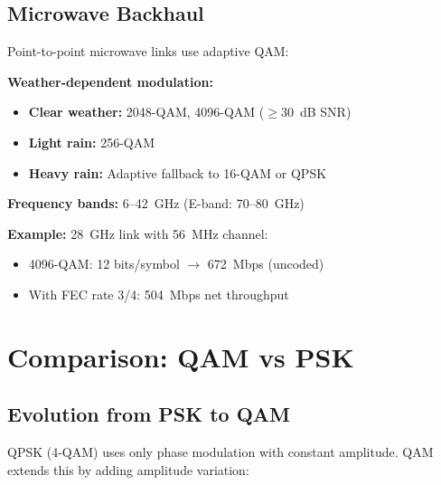\subsection{Microwave Backhaul}

Point-to-point microwave links use adaptive QAM:

\textbf{Weather-dependent modulation:}
\begin{itemize}
\item \textbf{Clear weather:} 2048-QAM, 4096-QAM ($\geq 30$~dB SNR)
\item \textbf{Light rain:} 256-QAM
\item \textbf{Heavy rain:} Adaptive fallback to 16-QAM or QPSK
\end{itemize}

\textbf{Frequency bands:} 6--42~GHz (E-band: 70--80~GHz)

\textbf{Example:} 28~GHz link with 56~MHz channel:
\begin{itemize}
\item 4096-QAM: 12 bits/symbol $\rightarrow$ 672~Mbps (uncoded)
\item With FEC rate 3/4: 504~Mbps net throughput
\end{itemize}

\section{Comparison: QAM vs PSK}

\subsection{Evolution from PSK to QAM}

QPSK (4-QAM) uses only phase modulation with constant amplitude. QAM extends this by adding amplitude variation:

